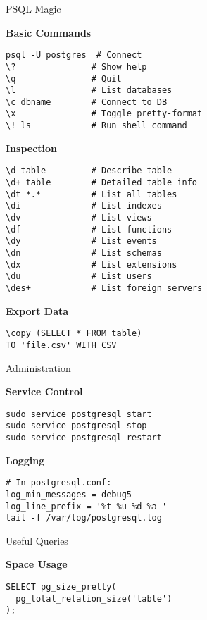 \documentclass[10pt]{article}
\begin{document}
\pagestyle{empty}
\setlength{\columnsep}{20pt}
\begin{multicols}{2}

{\titlefont\color{blueheader}\Large PSQL Magic}\vspace{5pt}

\textbf{\color{blueheader}Basic Commands}
\begin{lstlisting}
psql -U postgres  # Connect
\?               # Show help
\q               # Quit
\l               # List databases
\c dbname        # Connect to DB
\x               # Toggle pretty-format
\! ls            # Run shell command
\end{lstlisting}

\textbf{\color{blueheader}Inspection}
\begin{lstlisting}
\d table         # Describe table
\d+ table        # Detailed table info
\dt *.*          # List all tables
\di              # List indexes
\dv              # List views
\df              # List functions
\dy              # List events
\dn              # List schemas
\dx              # List extensions
\du              # List users
\des+            # List foreign servers
\end{lstlisting}

\textbf{\color{blueheader}Export Data}
\begin{lstlisting}
\copy (SELECT * FROM table) 
TO 'file.csv' WITH CSV
\end{lstlisting}

\columnbreak

{\titlefont\color{greenheader}\Large Administration}\vspace{5pt}

\textbf{\color{greenheader}Service Control}
\begin{lstlisting}
sudo service postgresql start
sudo service postgresql stop
sudo service postgresql restart
\end{lstlisting}

\textbf{\color{greenheader}Logging}
\begin{lstlisting}
# In postgresql.conf:
log_min_messages = debug5
log_line_prefix = '%t %u %d %a '
tail -f /var/log/postgresql.log
\end{lstlisting}

{\titlefont\color{purpleheader}\Large Useful Queries}\vspace{5pt}

\textbf{\color{purpleheader}Space Usage}
\begin{lstlisting}
SELECT pg_size_pretty(
  pg_total_relation_size('table')
);


\end{lstlisting}
\end{multicols}
\end{document}
